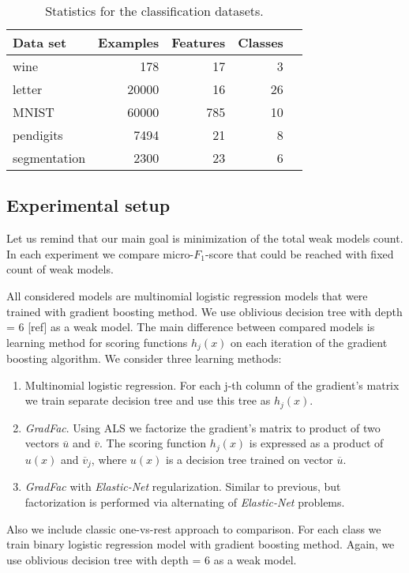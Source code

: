 \documentclass{article}
\begin{document}
\begin{table}[t]
\caption{Statistics for the classification datasets.}
\label{datasets}
\vskip 0.15in
\begin{center}
\begin{small}
\begin{sc}
\begin{tabular}{lrrrr}
\hline
\abovespace\belowspace
Data set & Examples & Features & Classes \\
\hline
\abovespace
wine     		& 178 	& 17 	& 3     \\
letter    		& 20000 & 16 	& 26 	\\
MNIST     		& 60000 & 785 	& 10    \\
pendigits 		& 7494 	& 21 	& 8 	\\
segmentation    & 2300 	& 23 	& 6     \\
\hline
\end{tabular}
\end{sc}
\end{small}
\end{center}
\vskip -0.1in
\end{table}


 
\subsection{Experimental setup}
Let us remind that our main goal is minimization of the total weak models count. In each experiment we compare micro-$F_1$-score that could be reached with fixed count of weak models. 

All considered models are multinomial logistic regression models that were trained with gradient boosting method. We use oblivious decision tree with depth = 6 [ref] as a weak model. The main difference between compared models is learning method for scoring functions $h_{j}(x)$ on each iteration of the gradient boosting algorithm. We consider three learning methods:
\begin{enumerate}
	\item Multinomial logistic regression. For each j-th column of the gradient's matrix we train separate decision tree and use this tree as $h_{j}(x)$.

	\item \emph{GradFac}. Using ALS we factorize the gradient's matrix to product of two vectors $\overline{u}$ and $\overline{v}$. The scoring function $h_{j}(x)$ is expressed as a product of $u(x)$ and $\overline{v}_{j}$, where $u(x)$ is a decision tree trained on vector $\overline{u}$.

	\item \emph{GradFac} with \emph{Elastic-Net} regularization. Similar to previous, but factorization is performed via alternating of \emph{Elastic-Net} problems.
\end{enumerate}
Also we include classic one-vs-rest approach to comparison. For each class we train binary logistic regression model with gradient boosting method. Again, we use oblivious decision tree with depth = 6 as a  weak model.
\end{document}
